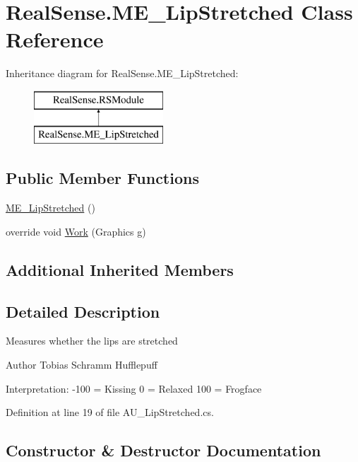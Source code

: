 \hypertarget{class_real_sense_1_1_m_e___lip_stretched}{}\section{Real\+Sense.\+M\+E\+\_\+\+Lip\+Stretched Class Reference}
\label{class_real_sense_1_1_m_e___lip_stretched}
Inheritance diagram for Real\+Sense.\+M\+E\+\_\+\+Lip\+Stretched\+:\begin{figure}[H]
\begin{center}
\leavevmode
\includegraphics[height=2.000000cm]{class_real_sense_1_1_m_e___lip_stretched}
\end{center}
\end{figure}
\subsection*{Public Member Functions}
\begin{DoxyCompactItemize}
\item 
\hyperlink{class_real_sense_1_1_m_e___lip_stretched_ad17e9d1c541c7a3f4ea1968106f7c233}{M\+E\+\_\+\+Lip\+Stretched} ()
\item 
override void \hyperlink{class_real_sense_1_1_m_e___lip_stretched_aac12b1dc2d342d24879e9566d8696083}{Work} (Graphics g)
\end{DoxyCompactItemize}
\subsection*{Additional Inherited Members}


\subsection{Detailed Description}
Measures whether the lips are stretched \begin{DoxyAuthor}{Author}
Tobias Schramm  Hufflepuff
\end{DoxyAuthor}
Interpretation\+: -\/100 = Kissing 0 = Relaxed 100 = Frogface 

Definition at line 19 of file A\+U\+\_\+\+Lip\+Stretched.\+cs.



\subsection{Constructor \& Destructor Documentation}
\mbox{\label{class_real_sense_1_1_m_e___lip_stretched_ad17e9d1c541c7a3f4ea1968106f7c233}} 
